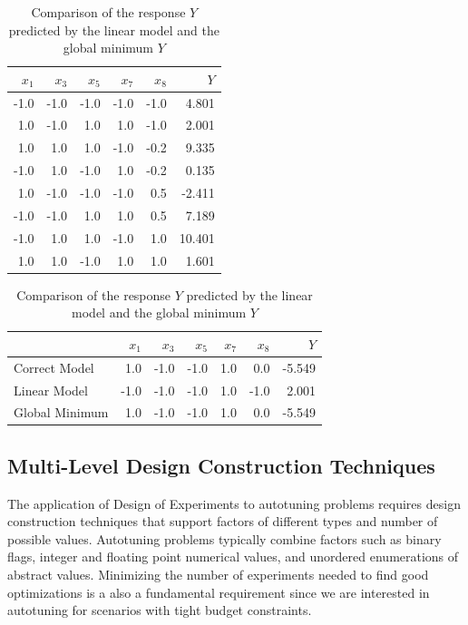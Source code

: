 \documentclass[conference]{IEEEtran}
\begin{document}
\begin{table}[ht]
\centering
\caption{Comparison of the response $Y$ predicted by the linear model and the global minimum $Y$}
\begingroup\footnotesize
\begin{tabular}{rrrrrr}
  \toprule
$x_1$ & $x_3$ & $x_5$ & $x_7$ & $x_8$ & $Y$ \\
  \midrule
-1.0 & -1.0 & -1.0 & -1.0 & -1.0 & 4.801 \\
  1.0 & -1.0 & 1.0 & 1.0 & -1.0 & 2.001 \\
  1.0 & 1.0 & 1.0 & -1.0 & -0.2 & 9.335 \\
  -1.0 & 1.0 & -1.0 & 1.0 & -0.2 & 0.135 \\
  1.0 & -1.0 & -1.0 & -1.0 & 0.5 & -2.411 \\
  -1.0 & -1.0 & 1.0 & 1.0 & 0.5 & 7.189 \\
  -1.0 & 1.0 & 1.0 & -1.0 & 1.0 & 10.401 \\
  1.0 & 1.0 & -1.0 & 1.0 & 1.0 & 1.601 \\
   \bottomrule
\end{tabular}
\endgroup
\end{table}

\begin{table}[ht]
\centering
\caption{Comparison of the response $Y$ predicted by the linear model and the global minimum $Y$}
\begingroup\footnotesize
\begin{tabular}{lrrrrrr}
  \toprule
 & $x_1$ & $x_3$ & $x_5$ & $x_7$ & $x_8$ & $Y$ \\
  \midrule
Correct Model & 1.0 & -1.0 & -1.0 & 1.0 & 0.0 & -5.549 \\
  Linear Model & -1.0 & -1.0 & -1.0 & 1.0 & -1.0 & 2.001 \\
  Global Minimum & 1.0 & -1.0 & -1.0 & 1.0 & 0.0 & -5.549 \\
   \bottomrule
\end{tabular}
\endgroup
\end{table}
\subsection{Multi-Level Design Construction Techniques}
\label{sec:org28ce24a}
The application of Design of Experiments to autotuning problems requires design
construction techniques that support factors of different types and number of
possible values. Autotuning problems typically combine factors such as binary
flags, integer and floating point numerical values, and unordered enumerations
of abstract values. Minimizing the number of experiments needed to find good
optimizations is a also a fundamental requirement since we are interested in
autotuning for scenarios with tight budget constraints.
\end{document}
